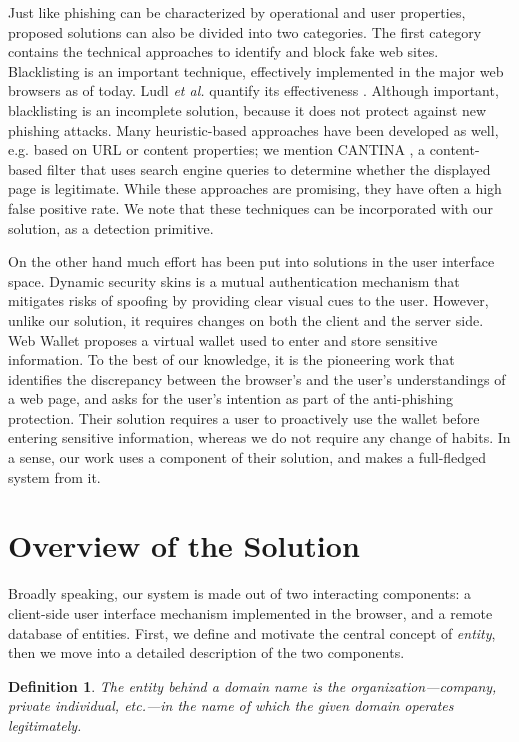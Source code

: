 \documentclass[11pt,styles/chicago]{article}
\begin{document}
Just like phishing can be characterized by operational and user properties, proposed solutions can also be divided into two categories. The first category contains the technical approaches to identify and block fake web sites. Blacklisting is an important technique, effectively implemented in the major web browsers as of today. Ludl \emph{et al.} quantify its effectiveness \cite{ludl2007effectiveness}. Although important, blacklisting is an incomplete solution, because it does not protect against new phishing attacks.  Many heuristic-based approaches have been developed as well, e.g. based on URL or content properties; we mention CANTINA \cite{zhang2007cantina}, a content-based filter that uses search engine queries to determine whether the displayed page is legitimate. While these approaches are promising, they have often a high false positive rate. We note that these techniques can be incorporated with our solution, as a detection primitive.

On the other hand much effort has been put into solutions in the user interface space. Dynamic security skins \cite{dhamija2005battle} is a mutual authentication mechanism that mitigates risks of spoofing by providing clear visual cues to the user. However, unlike our solution, it requires changes on both the client and the server side. Web Wallet \cite{wu2006web} proposes a virtual wallet used to enter and store sensitive information. To the best of our knowledge, it is the pioneering work that identifies the discrepancy between the browser's and the user's understandings of a web page, and asks for the user's intention as part of the anti-phishing protection. Their solution requires a user to proactively use the wallet before entering sensitive information, whereas we do not require any change of habits. In a sense, our work uses a component of their solution, and makes a full-fledged system from it.

\section{Overview of the Solution} %

Broadly speaking, our system is made out of two interacting components: a client-side user interface mechanism implemented in the browser, and a remote database of entities. First, we define and motivate the central concept of \emph{entity}, then we move into a detailed description of the two components.

\newtheorem*{def:entity}{Definition}
\begin{def:entity}
The entity behind a domain name is the organization---company, private individual, etc.---in the name of which the given domain operates legitimately.
\end{def:entity}
\end{document}
